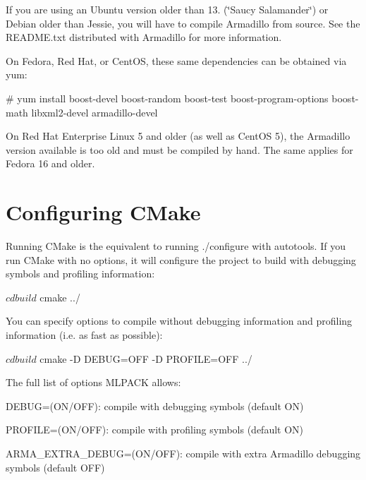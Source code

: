 If you are using an Ubuntu version older than 13. (\char`\"{}\-Saucy Salamander\char`\"{}) or Debian older than Jessie, you will have to compile Armadillo from source. See the R\-E\-A\-D\-M\-E.\-txt distributed with Armadillo for more information.

On Fedora, Red Hat, or Cent\-O\-S, these same dependencies can be obtained via yum\-:


\begin{DoxyCode}
\textcolor{preprocessor}{# yum install boost-devel boost-random boost-test boost-program-options}
\textcolor{preprocessor}{  boost-math libxml2-devel armadillo-devel}
\end{DoxyCode}


On Red Hat Enterprise Linux 5 and older (as well as Cent\-O\-S 5), the Armadillo version available is too old and must be compiled by hand. The same applies for Fedora 16 and older.\section{Configuring C\-Make}\label{build_config}
Running C\-Make is the equivalent to running {\ttfamily ./configure} with autotools. If you run C\-Make with no options, it will configure the project to build with debugging symbols and profiling information\-:


\begin{DoxyCode}
$ cd build
$ cmake ../
\end{DoxyCode}


You can specify options to compile without debugging information and profiling information (i.\-e. as fast as possible)\-:


\begin{DoxyCode}
$ cd build
$ cmake -D DEBUG=OFF -D PROFILE=OFF ../
\end{DoxyCode}


The full list of options M\-L\-P\-A\-C\-K allows\-:


\begin{DoxyItemize}
\item D\-E\-B\-U\-G=(O\-N/\-O\-F\-F)\-: compile with debugging symbols (default O\-N)
\item P\-R\-O\-F\-I\-L\-E=(O\-N/\-O\-F\-F)\-: compile with profiling symbols (default O\-N)
\item A\-R\-M\-A\-\_\-\-E\-X\-T\-R\-A\-\_\-\-D\-E\-B\-U\-G=(O\-N/\-O\-F\-F)\-: compile with extra Armadillo debugging symbols (default O\-F\-F)
\end{DoxyItemize}

